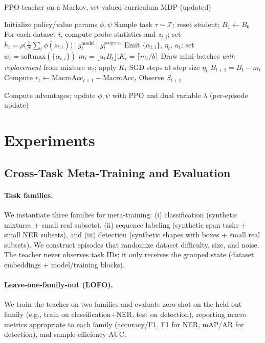 \documentclass[11pt]{article}
\newcommand{\MacroAcc}{\mathrm{MacroAcc}}
\newcommand{\1}{\mathbf{1}}
\begin{document}
\begin{algorithm}[H]
\caption{PPO teacher on a Markov, set-valued curriculum MDP (updated)}
\label{alg:ppo}
\begin{algorithmic}[1]
\State Initialize policy/value params $\phi,\psi$
    \State Sample task $\tau\sim\mathcal{T}$; reset student; $B_1\leftarrow B_0$
      \State {}
      \State For each dataset $i$, compute probe statistics and $z_{t,i}$; set $h_t=\rho\!\big(\tfrac{1}{N}\sum_i \phi(z_{t,i})\big)\,\Vert\,g^{\text{model}}_t\,\Vert\,g^{\text{progress}}_t$
      \State Emit $\{\alpha_{t,i}\}$, $\eta_t$, $u_t$; set $w_t=\mathrm{softmax}(\{\alpha_{t,i}\})$
      \State $m_t=\lfloor u_t B_t\rfloor$;\quad $K_t=\lceil m_t/b\rceil$
      \State Draw mini-batches \emph{with replacement} from mixture $w_t$; apply $K_t$ SGD steps at step size $\eta_t$
      \State $B_{t+1}=B_t-m_t$
      \State Compute $r_t \leftarrow \MacroAcc_{t+1}-\MacroAcc_t$
      \State Observe $S_{t+1}$

    \EndFor
  \EndFor
  \State Compute advantages; update $\phi,\psi$ with PPO and dual variable $\lambda$ (per-episode update)
\EndFor
\end{algorithmic}
\end{algorithm}

\section{Experiments}
\subsection{Cross-Task Meta-Training and Evaluation}
\paragraph{Task families.}
We instantiate three families for meta-training: (i) classification (synthetic mixtures + small real subsets), (ii) sequence labeling (synthetic span tasks + small NER subsets), and (iii) detection (synthetic shapes with boxes + small real subsets). 
We construct episodes that randomize dataset difficulty, size, and noise. 
The teacher never observes task IDs; it only receives the grouped state (dataset embeddings + model/training blocks).

\paragraph{Leave-one-family-out (LOFO).}
We train the teacher on two families and evaluate zero-shot on the held-out family (e.g., train on classification+NER, test on detection), reporting macro metrics appropriate to each family (accuracy/F1, F1 for NER, mAP/AR for detection), and sample-efficiency AUC.
\end{document}
